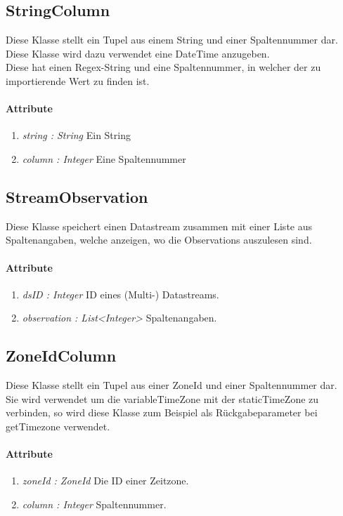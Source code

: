 \subsection{StringColumn}
Diese Klasse stellt ein Tupel aus einem String und einer Spaltennummer dar.
Diese Klasse wird dazu verwendet eine DateTime anzugeben. \\Diese hat einen Regex-String und eine Spaltennummer, in welcher der zu importierende Wert zu finden ist.
\paragraph{Attribute}
\begin{enumerate}[-]
	\item \textit{string : String} Ein String
	\item \textit{column : Integer} Eine Spaltennummer
\end{enumerate} 

\subsection{StreamObservation}
Diese Klasse speichert einen Datastream zusammen mit einer Liste aus Spaltenangaben, welche anzeigen, wo die Observations auszulesen sind.
\paragraph{Attribute} 
\begin{enumerate}[-]
	\item \textit{dsID : Integer} ID eines (Multi-) Datastreams. 
	\item \textit{observation : List<Integer>} Spaltenangaben.
\end{enumerate}

\subsection{ZoneIdColumn}
Diese Klasse stellt ein Tupel aus einer ZoneId und einer Spaltennummer dar.\\
Sie wird verwendet um die variableTimeZone mit der staticTimeZone zu verbinden, so wird diese Klasse zum Beispiel als Rückgabeparameter bei getTimezone verwendet.

\paragraph{Attribute}
\begin{enumerate}[-]
	\item \textit{zoneId : ZoneId} Die ID einer Zeitzone.
	\item \textit{column : Integer} Spaltennummer.
\end{enumerate}


